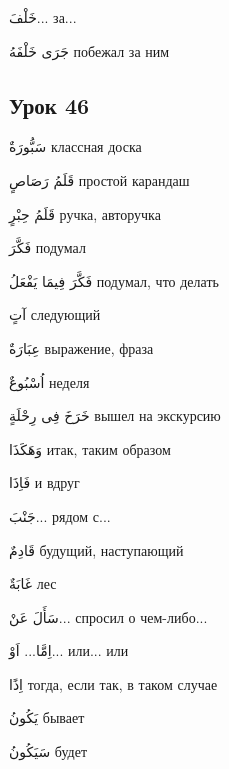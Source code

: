 \documentclass[a5paper]{article}
\newcommand\textstyleDropCaps[1]{#1}
\newcommand\textstyleCaptioncharacters[1]{#1}
\begin{document}
\textstyleCaptioncharacters{خَلْفَ...ِ }\textstyleDropCaps{за...‎}

\textstyleCaptioncharacters{جَرَى خَلْفَهُ }\textstyleDropCaps{побежал за ним‎}

\subsection[Урок 46‎]{\textstyleDropCaps{Урок 46‎}}
\textstyleCaptioncharacters{سَبُّورَةٌ }\textstyleDropCaps{классная доска‎}

\textstyleCaptioncharacters{قَلَمُ رَصَاصٍ }\textstyleDropCaps{простой ка­рандаш‎}

\textstyleCaptioncharacters{قَلَمُ حِبْرٍ }\textstyleDropCaps{ручка, авторуч­ка‎}

\textstyleCaptioncharacters{فَكَّرَ }\textstyleDropCaps{подумал‎}

\textstyleCaptioncharacters{فَكَّرَ فِيمَا يَفْعَلُ }\textstyleDropCaps{поду­мал, что делать‎}

\textstyleCaptioncharacters{آتٍ }\textstyleDropCaps{следующий‎}

\textstyleCaptioncharacters{عِبَارَةٌ }\textstyleDropCaps{выражение, фраза‎}

\textstyleCaptioncharacters{اُسْبُوعٌ }\textstyleDropCaps{неделя‎}

\textstyleCaptioncharacters{خَرَخَ فِى رِحْلَةٍ }\textstyleDropCaps{вышел на экскурсию‎}

\textstyleCaptioncharacters{وَهَكَذَا }\textstyleDropCaps{итак, таким об­разом‎}

\textstyleCaptioncharacters{فَاِذَا }\textstyleDropCaps{и вдруг‎}

\textstyleCaptioncharacters{جَنْبَ...ِ }\textstyleDropCaps{рядом с...‎}

\textstyleCaptioncharacters{قَادِمٌ }\textstyleDropCaps{будущий, наступаю­щий‎}

\textstyleCaptioncharacters{غَابَةٌ }\textstyleDropCaps{лес‎}

\textstyleCaptioncharacters{سَأَلَ عَنْ...ِ }\textstyleDropCaps{спросил о чем-либо...‎}

\textstyleCaptioncharacters{اِمَّا... اَوْ...ِ }\textstyleDropCaps{или... или‎}

\textstyleCaptioncharacters{اِذًا }\textstyleDropCaps{тогда, если так, в таком случае‎}

\textstyleCaptioncharacters{يَكُونُ }\textstyleDropCaps{бывает‎}

\textstyleCaptioncharacters{سَيَكُونُ }\textstyleDropCaps{будет‎}
\end{document}
